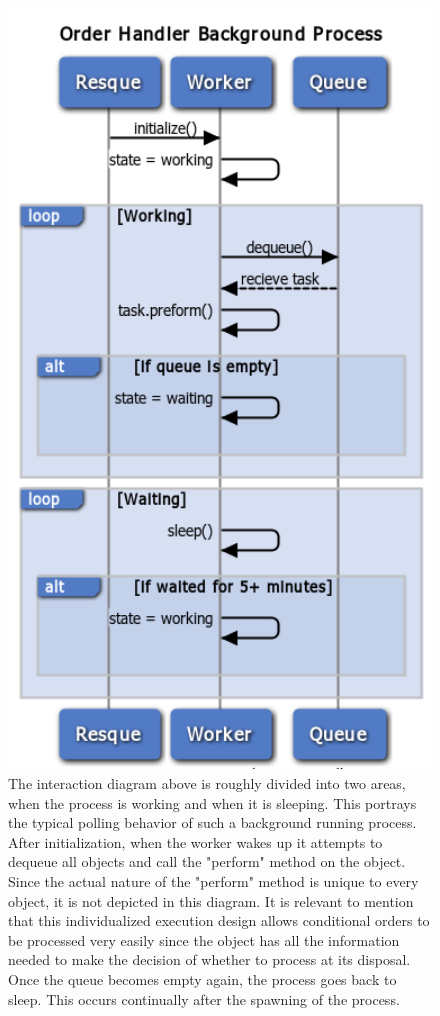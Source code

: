 \begin{figure}
\centering
\includegraphics[width=5.5in]{./Diagrams/ComponentModels/stateMachineDiagrams/Worker1/worker1.png}
\caption{The interaction diagram above is roughly divided into two areas, when the process is working and when it is sleeping. This portrays the typical polling behavior of such a background running process. After initialization, when the worker wakes up it attempts to dequeue all objects and call the "perform" method on the object. Since the actual nature of the "perform" method is unique to every object, it is not depicted in this diagram. It is relevant to mention that this individualized execution design allows conditional orders to be processed very easily since the object has all the information needed to make the decision of whether to process at its disposal. Once the queue becomes empty again, the process goes back to sleep. This occurs continually after the spawning of the process.}
\end{figure}

